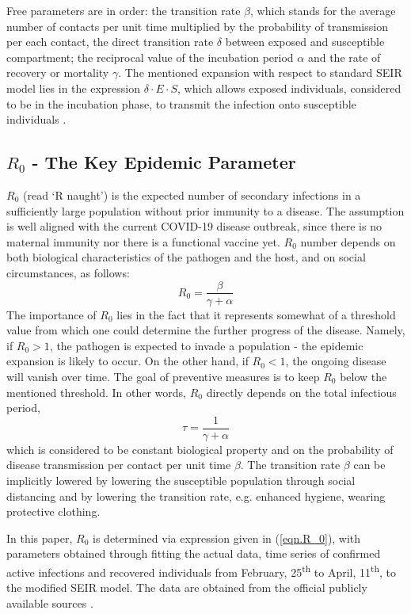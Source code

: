 \documentclass[conference]{IEEEtran}
\begin{document}
Free parameters are in order: the transition rate $\beta$, which stands for the average number of contacts per unit time multiplied by the probability of transmission per each contact, the direct transition rate $\delta$ between exposed and susceptible compartment; the reciprocal value of the incubation period $\alpha$ and the rate of recovery or mortality $\gamma$.
The mentioned expansion with respect to standard SEIR model lies in the expression $\delta \cdot E \cdot S$,  which allows exposed individuals, considered to be in the incubation phase, to transmit the infection onto susceptible individuals \cite{Wei2020}. 

\subsection{$R_0$ - The Key Epidemic Parameter}
\label{sec.modeling.R_0}
$R_0$ (read ‘R naught’) is the expected number of secondary infections in a sufficiently large population without prior immunity to a disease. The assumption is well aligned with the current COVID-19 disease outbreak, since there is no maternal immunity nor there is a functional vaccine yet.
$R_0$ number depends on both biological characteristics of the pathogen and the host, and on social circumstances, as follows: 
\begin{equation} \label{eqn.R_0}
    R_0 = \frac{\beta}{\gamma + \alpha}
\end{equation}{}
The importance of $R_0$ lies in the fact that it represents somewhat of a threshold value from which one could determine the further progress of the disease. Namely, if $R_0 > 1$, the pathogen is expected to invade a population - the epidemic expansion is likely to occur. On the other hand, if $R_0 < 1$, the ongoing disease will vanish over time. The goal of preventive measures is to keep $R_0$ below the mentioned threshold.
In other words, $R_0$ directly depends on the total infectious period,
\begin{equation}
    \tau = \frac{1}{\gamma + \alpha}
\end{equation}
which is considered to be constant biological property and on the probability of disease transmission per contact per unit time $\beta$. The transition rate $\beta$ can be implicitly lowered by lowering the susceptible population through social distancing and by lowering the transition rate, e.g. enhanced hygiene, wearing protective clothing. 

In this paper, $R_0$ is determined via expression given in (\ref{eqn.R_0}), with parameters obtained through fitting the actual data, time series of confirmed active infections and recovered individuals from February, 25\textsuperscript{th} to April, 11\textsuperscript{th}, to the modified SEIR model. The data are obtained from the official publicly available sources \cite{koronavirushr}.
\end{document}
